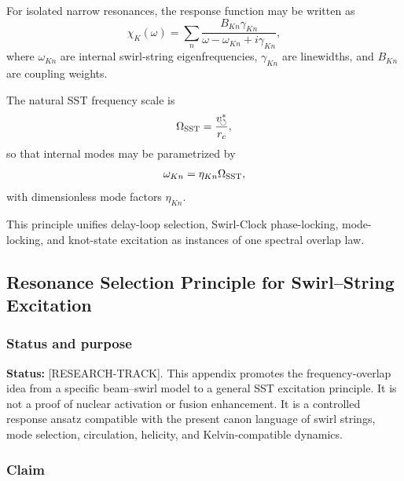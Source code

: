     For isolated narrow resonances, the response function may be written as
    \begin{equation}
        \chi_K(\omega)
        =
        \sum_n
        \frac{B_{Kn}\gamma_{Kn}}
        {\omega-\omega_{Kn}+i\gamma_{Kn}},
    \end{equation}
    where \(\omega_{Kn}\) are internal swirl-string eigenfrequencies,
    \(\gamma_{Kn}\) are linewidths, and \(B_{Kn}\) are coupling weights.
    
    The natural SST frequency scale is
    \begin{equation}
        \Omega_{\rm SST}
        =
        \frac{v_{\!\boldsymbol{\circlearrowleft}}^{\ast}}{r_c},
    \end{equation}
    so that internal modes may be parametrized by
    \begin{equation}
        \omega_{Kn}
        =
        \eta_{Kn}\Omega_{\rm SST},
    \end{equation}
    with dimensionless mode factors \(\eta_{Kn}\).
    
    This principle unifies delay-loop selection, Swirl-Clock phase-locking,
    mode-locking, and knot-state excitation as instances of one spectral
    overlap law.
    
    
\subsection{Resonance Selection Principle for Swirl--String Excitation}
    \label{app:resonance-selection-principle}
    
    \subsubsection*{Status and purpose}
        
        \noindent
        \textbf{Status:} [RESEARCH-TRACK].
        This appendix promotes the frequency-overlap idea from a specific beam--swirl model to a general SST excitation principle. It is not a proof of nuclear activation or fusion enhancement. It is a controlled response ansatz compatible with the present canon language of swirl strings, mode selection, circulation, helicity, and Kelvin-compatible dynamics.
    
    \subsubsection*{Claim}
        
